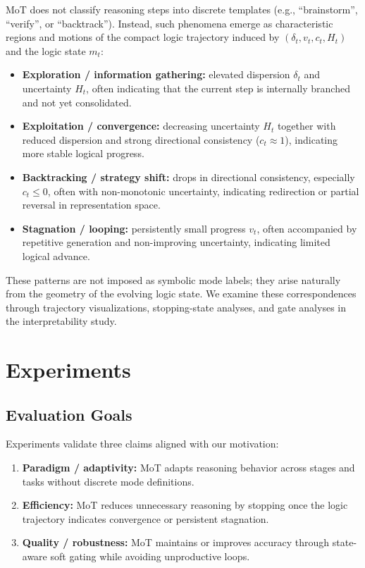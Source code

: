 \documentclass{article}
\begin{document}
MoT does not classify reasoning steps into discrete templates (e.g., ``brainstorm'', ``verify'', or ``backtrack''). Instead, such phenomena emerge as characteristic regions and motions of the compact logic trajectory induced by $(\delta_t, v_t, c_t, H_t)$ and the logic state $m_t$:
\begin{itemize}[leftmargin=1.3em, itemsep=0.2em]
    \item \textbf{Exploration / information gathering:} elevated dispersion $\delta_t$ and uncertainty $H_t$, often indicating that the current step is internally branched and not yet consolidated.
    \item \textbf{Exploitation / convergence:} decreasing uncertainty $H_t$ together with reduced dispersion and strong directional consistency ($c_t \approx 1$), indicating more stable logical progress.
    \item \textbf{Backtracking / strategy shift:} drops in directional consistency, especially $c_t \le 0$, often with non-monotonic uncertainty, indicating redirection or partial reversal in representation space.
    \item \textbf{Stagnation / looping:} persistently small progress $v_t$, often accompanied by repetitive generation and non-improving uncertainty, indicating limited logical advance.
\end{itemize}
These patterns are not imposed as symbolic mode labels; they arise naturally from the geometry of the evolving logic state. We examine these correspondences through trajectory visualizations, stopping-state analyses, and gate analyses in the interpretability study.
 
\section{Experiments}
\label{sec:experiments}

\subsection{Evaluation Goals}
Experiments validate three claims aligned with our motivation:
\begin{enumerate}[leftmargin=1.3em, itemsep=0.2em]
    \item \textbf{Paradigm / adaptivity:} MoT adapts reasoning behavior across stages and tasks without discrete mode definitions.
    \item \textbf{Efficiency:} MoT reduces unnecessary reasoning by stopping once the logic trajectory indicates convergence or persistent stagnation.
    \item \textbf{Quality / robustness:} MoT maintains or improves accuracy through state-aware soft gating while avoiding unproductive loops.
\end{enumerate}
\end{document}
